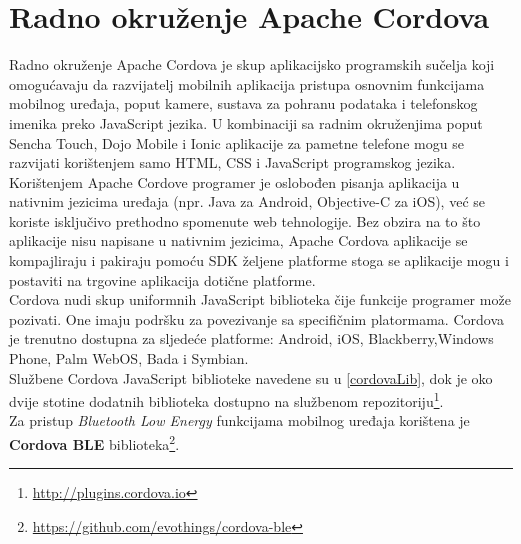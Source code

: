 \chapter{Radno okruženje Apache Cordova}

Radno okruženje Apache Cordova je skup aplikacijsko programskih sučelja  koji omogućavaju da razvijatelj mobilnih aplikacija pristupa osnovnim funkcijama mobilnog uređaja, poput kamere, sustava za pohranu podataka i telefonskog imenika preko JavaScript jezika. 
U kombinaciji sa radnim okruženjima poput Sencha Touch, Dojo Mobile i Ionic aplikacije za pametne telefone mogu se razvijati korištenjem samo HTML, CSS i JavaScript programskog jezika.
\\

Korištenjem Apache Cordove programer je oslobođen pisanja aplikacija u nativnim jezicima uređaja (npr. Java za Android, Objective-C za iOS), već se koriste isključivo prethodno spomenute web tehnologije. 
Bez obzira na to što aplikacije nisu napisane u nativnim jezicima, Apache Cordova aplikacije se kompajliraju i pakiraju pomoću SDK  željene platforme stoga se aplikacije mogu i postaviti na trgovine aplikacija  dotične platforme. 
\\

Cordova nudi skup uniformnih JavaScript biblioteka čije funkcije programer može pozivati. 
One imaju podršku za povezivanje sa specifičnim platormama. Cordova je trenutno dostupna za sljedeće platforme: Android, iOS, Blackberry,Windows Phone, Palm WebOS, Bada i Symbian.
\\
Službene Cordova JavaScript biblioteke navedene su u \ref{cordovaLib}, dok je oko dvije stotine dodatnih biblioteka dostupno na službenom repozitoriju\footnote{\url{http://plugins.cordova.io}}. %
\\
Za pristup \textit{Bluetooth Low Energy} funkcijama mobilnog uređaja korištena je \textbf{Cordova BLE} biblioteka\footnote{\url{https://github.com/evothings/cordova-ble}}.
\\


